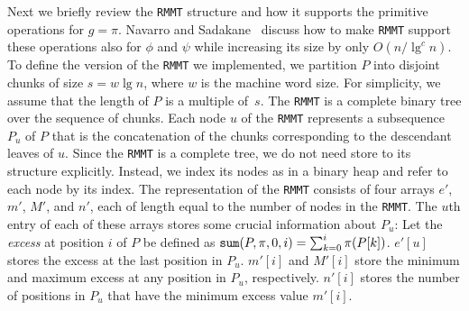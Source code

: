 Next we briefly review the {\tt RMMT} structure and how it supports
the primitive operations for $g = \pi$.  Navarro and
Sadakane~\cite{Navarro:2014:FFS:2620785.2601073} discuss how to make
{\tt RMMT} support these operations also for $\phi$ and $\psi$ while
increasing its size by only $O(n/\lg^c n)$.  To define the version of
the {\tt RMMT} we implemented, we partition $P$ into disjoint chunks
of size $s = w \lg n$, where $w$ is the machine word size.  For
simplicity, we assume that the length of $P$ is a multiple of~$s$.
The {\tt RMMT} is a complete binary tree over the sequence of
chunks. Each node $u$ of the {\tt RMMT} represents a subsequence $P_u$
of $P$ that is the concatenation of the chunks corresponding to the
descendant leaves of $u$.  Since the {\tt RMMT} is a complete tree, we
do not need store to its structure explicitly.  Instead, we index its
nodes as in a binary heap and refer to each node by its index.  The
representation of the {\tt RMMT} consists of four arrays $e'$, $m'$,
$M'$, and $n'$, each of length equal to the number of nodes in the
{\tt RMMT}.  The $u$th entry of each of these arrays stores some
crucial information about $P_u$: Let the {\em excess} at position $i$
of $P$ be defined as $\mathtt{sum}(P,\pi,0,i) = \sum_{k=0}^{i} \pi(P[k])$.
$e'[u]$ stores the excess at the last position in $P_u$.  $m'[i]$ and
$M'[i]$ store the minimum and maximum excess at any position in $P_u$,
respectively.  $n'[i]$ stores the number of positions in $P_u$ that
have the minimum excess value $m'[i]$.

